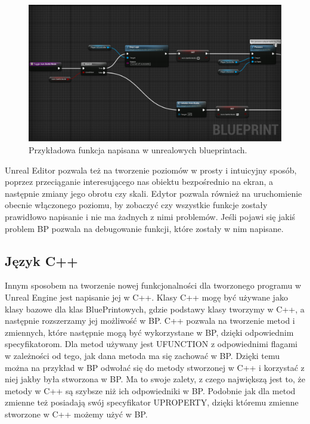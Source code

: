 \documentclass[a4paper,12pt,reqno]{article}
\begin{document}
\begin{figure}[!ht]%
\centering
\includegraphics[width=1\columnwidth]{graphics/BPExample.png}
\caption{Przykładowa funkcja napisana w unrealowych blueprintach.
\label{BPExample}}%
%
\qquad
\end{figure}  

Unreal Editor pozwala też na tworzenie poziomów w prosty i intuicyjny sposób, poprzez przeciąganie interesującego nas obiektu bezpośrednio na ekran, a następnie zmiany jego obrotu czy skali. Edytor pozwala również na uruchomienie obecnie włączonego poziomu, by zobaczyć czy wszystkie funkcje zostały prawidłowo napisanie i nie ma żadnych z nimi problemów. Jeśli pojawi się jakiś problem BP pozwala na debugowanie funkcji, które zostały w nim napisane.
\subsection{Język C++}

Innym sposobem na tworzenie nowej funkcjonalności dla tworzonego programu w Unreal Engine jest napisanie jej w C++. Klasy C++ mogę być używane jako klasy bazowe dla klas BluePrintowych, gdzie podstawy klasy tworzymy w C++, a następnie rozszerzamy jej możliwość w BP. C++ pozwala na tworzenie metod i zmiennych, które następnie mogą być wykorzystane w BP, dzięki odpowiednim specyfikatorom. Dla metod używany jest UFUNCTION z odpowiednimi flagami w zależności od tego, jak dana metoda ma się zachować w BP. Dzięki temu można na przykład w BP odwołać się do metody stworzonej w C++ i korzystać z niej jakby była stworzona w BP. Ma to swoje zalety, z czego największą jest to, że metody w C++ są szybsze niż ich odpowiedniki w BP. Podobnie jak dla metod zmienne też posiadają swój specyfikator UPROPERTY, dzięki któremu zmienne stworzone w C++ możemy użyć w BP.



\end{document}
